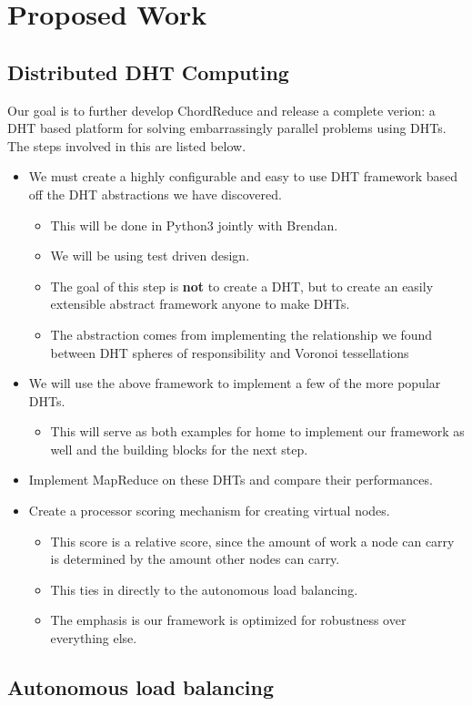 \chapter{Proposed Work}

\section{Distributed DHT Computing}




Our goal is to further develop ChordReduce and release a complete verion: a DHT based platform for solving embarrassingly parallel problems using DHTs.
The steps involved in this are listed below.

\begin{itemize}
	\item We must create a highly configurable and easy to use DHT framework based off the DHT abstractions we have discovered.
	\begin{itemize}
		\item This will be done in Python3 jointly with Brendan.
		\item We will be using test driven design.
		\item The goal of this step is \textbf{not} to create a DHT, but to create an easily extensible abstract framework anyone to make DHTs.
		\item The abstraction comes from implementing the relationship we found between DHT spheres of responsibility and Voronoi tessellations
	\end{itemize}
	\item We will use the above framework to implement a few of the more popular DHTs.
	\begin{itemize}
		\item This will serve as both examples for home to implement our framework as well and the building blocks for the next step.
	\end{itemize}
	\item Implement MapReduce on these DHTs and compare their performances.
	\item Create a  processor scoring mechanism for creating virtual nodes.
	\begin{itemize}
		\item This score is a relative score, since the amount of work a node can carry is determined by the amount other nodes can carry.
		
		\item This ties in directly to the autonomous load balancing.
	\end{itemize}
	\begin{itemize}
		\item The emphasis is our framework is optimized for robustness over everything else.
	\end{itemize}
	
\end{itemize}



\section{Autonomous load balancing}



